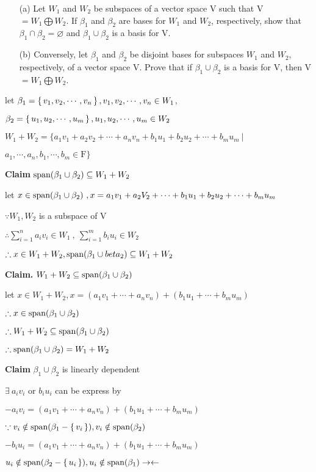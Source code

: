\begin{enumerate}
	\item[(a)] Let $W_1$ and $W_2$ be subspaces of a vector space V such that V $= W_1 \bigoplus W_2$. If $\beta_{1}$ and $\beta_{2}$ are bases for $W_1$ and $W_2$, respectively, show that $\beta_1 \cap \beta_2 = \varnothing$ and $\beta_1 \cup \beta_2$ is a basis for V.
	\item[(b)] Conversely, let $\beta_1$ and $\beta_2$ be disjoint bases for subspaces $W_1$ and $W_2$, respectively, of a vector space V. Prove that if $\beta_1 \cup \beta_2$ is a basis for V, then V $= W_1 \bigoplus W_2$.
\end{enumerate}

\begin{tcolorbox}
	\begin{solution}
		let $\beta_1 = \left\{ \,v_1,v_2,\cdots,v_n \,\right\},v_1,v_2,\cdots,v_n \in W_1$,
		
		 $\beta_2 = \left\{ \,u_1,u_2,\cdots,u_m \,\right\},u_1,u_2,\cdots,u_m \in W_2$
		
		$W_1 + W_2 = \{a_1v_1+a_2v_2+\cdots+a_nv_n+b_1u_1+b_2u_2+\cdots+b_mu_m ~|~  $ 
		
		$a_1,\cdots,a_n,b_1,\cdots,b_m \in \mathrm{F}\} $
		
		\textbf{Claim} $\text{span($\beta_1 \cup \beta_2$)} \subseteq W_1 + W_2$
		
		let $x \in \text{span($\beta_1 \cup \beta_2$)}~, x = a_1v_1 + a_2V_2 + \cdots + b_1u_1 + b_2u_2 + \cdots + b_mu_m$
		
		$\because W_1,W_2$ is a subspace of V
		
		$\therefore \sum^{n}_{i=1}a_iv_i \in W_1~,~ \sum^{m}_{i=1}b_iu_i \in W_2$
		
		$\therefore x \in W_1 + W_2,\text{span($\beta_1 \cup beta_2$)} \subseteq W_1 + W_2$
		
		\textbf{Claim.} $W_1 + W_2 \subseteq \text{span($\beta_1 \cup \beta_2$)}$
		
		let $x \in W_1 + W_2, x = (a_1v_1 + \cdots + a_nv_n) + (b_1u_1 + \cdots  + b_mu_m)$
		
		$\therefore x \in \text{span($\beta_1 \cup \beta_2$)}$
		
		$\therefore W_1 + W_2 \subseteq \text{span($\beta_1 \cup \beta_2$)}$
		
		$\therefore \text{span($\beta_1 \cup \beta_2$)} = W_1 + W_2$


		\textbf{Claim} ${\beta_1 \cup \beta_2}$ is linearly dependent
		
		$\exists~a_iv_i$ or $b_iu_i$ can be express by
		
		$-a_iv_i = (a_1v_1+\cdots+a_nv_n)+(b_1u_1+\cdots+b_mu_m)$ 
		
		$\because v_i \notin \text{span($\beta_1-\left\{ \,v_i \,\right\}$)}, v_i \notin \text{span($\beta_2$)}$
		
		$-b_iu_i = (a_1v_1+\cdots+a_nv_n)+(b_1u_1+\cdots+b_mu_m)$ 
		
		$u_i \notin \text{span($\beta_2-\left\{ \,u_i \,\right\}$)}, u_i \notin \text{span($\beta_1$)} \rightarrow\leftarrow$
		
	\end{solution}
\end{tcolorbox}